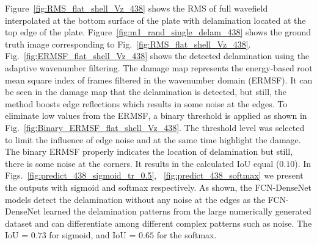 Figure~\ref{fig:RMS_flat_shell_Vz_438} shows the RMS of full wavefield interpolated at the bottom surface of the plate with delamination located at the top edge of the plate.
Figure~\ref{fig:m1_rand_single_delam_438} shows the ground truth image corresponding to Fig.~\ref{fig:RMS_flat_shell_Vz_438}. 
Fig.~\ref{fig:ERMSF_flat_shell_Vz_438} shows the detected delamination using the adaptive wavenumber filtering. 
The damage map represents the energy-based root mean square index of frames filtered in the wavenumber domain (ERMSF). 
It can be seen in the damage map that the delamination is detected, but still, the method boosts edge reflections which results in some noise at the edges. 
To eliminate low values from the ERMSF, a binary threshold is applied as shown in Fig.~\ref{fig:Binary_ERMSF_flat_shell_Vz_438}.
The threshold level was selected to limit the influence of edge noise and at the same time highlight the damage. 
The binary ERMSF properly indicates the location of delamination but still, there is some noise at the corners.
It results in the calculated IoU equal (\(0.10\)).
In Figs.~\ref{fig:predict_438_sigmoid_tr_0.5}, ~\ref{fig:predict_438_softmax} we present the \DIFdelbegin {}\DIFdelend \DIFaddbegin {}\DIFaddend outputs with sigmoid and softmax respectively.
As shown, the FCN-DenseNet models detect the delamination without any noise at the edges as the FCN-DenseNet learned the delamination patterns from the large numerically generated dataset and can differentiate among different complex patterns such as noise.   
The IoU = \(0.73\) for sigmoid, and IoU = \(0.65\) for the softmax.
